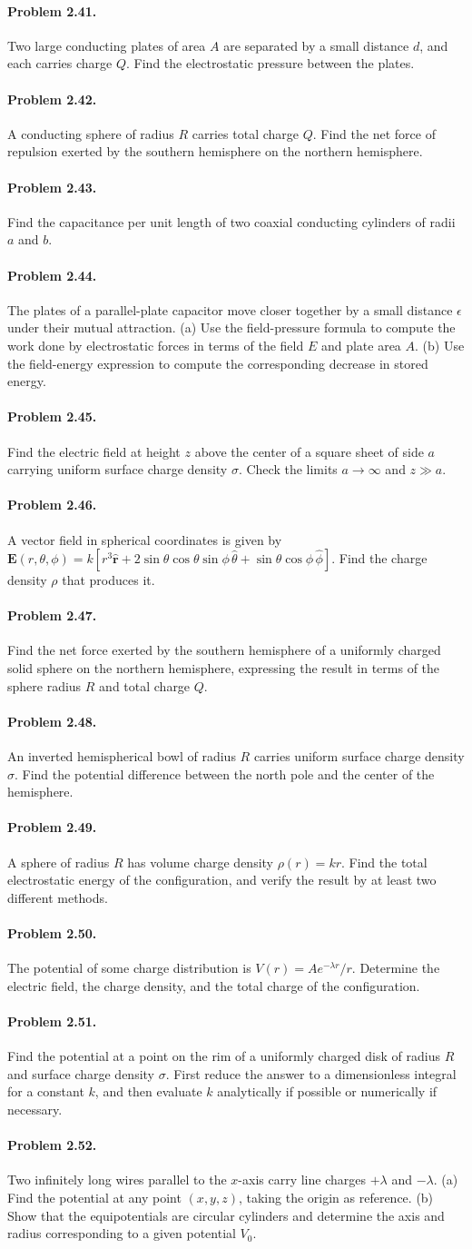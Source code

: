 \documentclass{aa}
\newcommand{\problemstatement}[2]{%
\paragraph{Problem #1.}#2\par\medskip
}
\begin{document}
\problemstatement{2.41}{Two large conducting plates of area \(A\) are separated by a small distance \(d\), and each carries charge \(Q\). Find the electrostatic pressure between the plates.}
\problemstatement{2.42}{A conducting sphere of radius \(R\) carries total charge \(Q\). Find the net force of repulsion exerted by the southern hemisphere on the northern hemisphere.}
\problemstatement{2.43}{Find the capacitance per unit length of two coaxial conducting cylinders of radii \(a\) and \(b\).}
\problemstatement{2.44}{The plates of a parallel-plate capacitor move closer together by a small distance \(\epsilon\) under their mutual attraction. (a) Use the field-pressure formula to compute the work done by electrostatic forces in terms of the field \(E\) and plate area \(A\). (b) Use the field-energy expression to compute the corresponding decrease in stored energy.}
\problemstatement{2.45}{Find the electric field at height \(z\) above the center of a square sheet of side \(a\) carrying uniform surface charge density \(\sigma\). Check the limits \(a\to\infty\) and \(z\gg a\).}
\problemstatement{2.46}{A vector field in spherical coordinates is given by \(\mathbf E(r,\theta,\phi)=k[r^3\hat{\mathbf r}+2\sin\theta\cos\theta\sin\phi\,\hat{\theta}+\sin\theta\cos\phi\,\hat{\phi}]\). Find the charge density \(\rho\) that produces it.}
\problemstatement{2.47}{Find the net force exerted by the southern hemisphere of a uniformly charged solid sphere on the northern hemisphere, expressing the result in terms of the sphere radius \(R\) and total charge \(Q\).}
\problemstatement{2.48}{An inverted hemispherical bowl of radius \(R\) carries uniform surface charge density \(\sigma\). Find the potential difference between the north pole and the center of the hemisphere.}
\problemstatement{2.49}{A sphere of radius \(R\) has volume charge density \(\rho(r)=kr\). Find the total electrostatic energy of the configuration, and verify the result by at least two different methods.}
\problemstatement{2.50}{The potential of some charge distribution is \(V(r)=A e^{-\lambda r}/r\). Determine the electric field, the charge density, and the total charge of the configuration.}
\problemstatement{2.51}{Find the potential at a point on the rim of a uniformly charged disk of radius \(R\) and surface charge density \(\sigma\). First reduce the answer to a dimensionless integral for a constant \(k\), and then evaluate \(k\) analytically if possible or numerically if necessary.}
\problemstatement{2.52}{Two infinitely long wires parallel to the \(x\)-axis carry line charges \(+\lambda\) and \(-\lambda\). (a) Find the potential at any point \((x,y,z)\), taking the origin as reference. (b) Show that the equipotentials are circular cylinders and determine the axis and radius corresponding to a given potential \(V_0\).}
\end{document}
